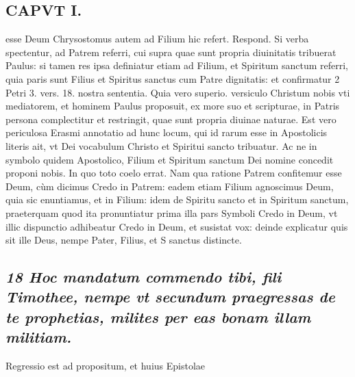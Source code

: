 \documentclass{article}
\begin{document}
\begin{pages}
\section*{CAPVT I. }
\marginpar{[ p.33 ]}\pstart esse Deum Chrysostomus autem ad Filium hic refert. Respond. Si verba spectentur, ad Patrem referri, cui supra quae sunt propria diuinitatis tribuerat Paulus: si tamen res ipsa definiatur etiam ad Filium, et Spiritum sanctum referri, quia paris sunt Filius et Spiritus sanctus cum Patre dignitatis: et confirmatur 2 Petri 3. vers. 18. nostra sententia. Quia vero superio. versiculo Christum nobis vti mediatorem, et hominem Paulus proposuit, ex more suo et scripturae, in Patris persona complectitur et restringit, quae sunt propria diuinae naturae. Est vero periculosa Erasmi annotatio ad hunc locum, qui id rarum esse in Apostolicis literis ait, vt Dei vocabulum Christo et Spiritui sancto tribuatur. Ac ne in symbolo quidem Apostolico, Filium et Spiritum sanctum Dei nomine concedit proponi nobis. In quo toto coelo errat. Nam qua ratione Patrem confitemur esse Deum, cùm dicimus Credo in Patrem: eadem etiam Filium agnoscimus Deum, quia sic enuntiamus, et in Filium: idem de Spiritu sancto et in Spiritum sanctum, praeterquam quod ita pronuntiatur prima illa pars Symboli Credo in Deum, vt illic dispunctio adhibeatur Credo in Deum, et susistat vox: deinde explicatur quis sit ille Deus, nempe Pater, Filius, et S sanctus distincte.  \pend
{}
{}
\subsection*{\textit{18 Hoc mandatum commendo tibi, fili Timothee, nempe vt secundum praegressas de te prophetias, milites per eas bonam illam militiam. }}\pstart Regressio est ad propositum, et huius Epistolae  \pend

\end{pages}
\end{document}

